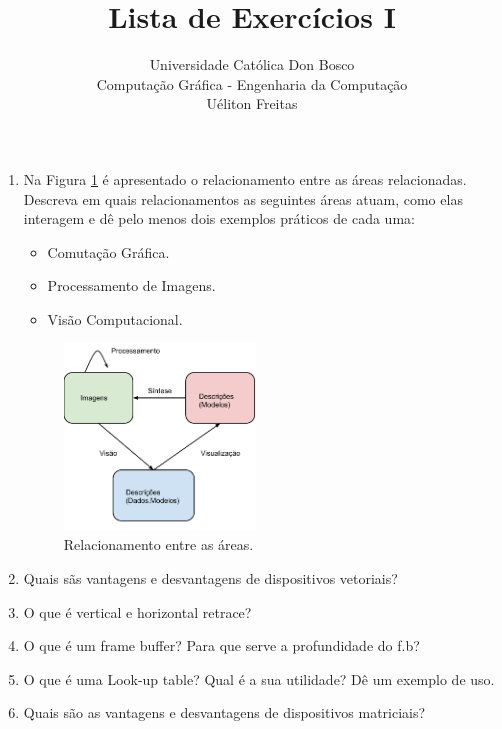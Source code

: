 \documentclass[12pt,a4paper]{article}
\author{Universidade Católica Don Bosco \\ Computação Gráfica - Engenharia da Computação \\Uéliton Freitas}
\title{Lista de Exercícios I}
\begin{document}
\maketitle


\begin{enumerate}
	\item Na Figura \ref{Fig:are} é apresentado o relacionamento entre as áreas relacionadas. Descreva em quais relacionamentos as seguintes áreas atuam, como elas interagem e dê pelo menos dois exemplos práticos de cada uma:
	\begin{itemize}
		\item Comutação Gráfica.
		\item Processamento de Imagens.
		\item Visão Computacional.
	\end{itemize}
	
		\begin{figure}[!h]
		\label{Fig:are}
			\begin{center}
			\includegraphics[width=0.48\textwidth]{Are}
			\caption{Relacionamento entre as áreas.}
			
			\end{center}
	\end{figure}
	

	\item Quais sãs vantagens e desvantagens de dispositivos vetoriais?	
	
	\item O que  é vertical e horizontal retrace?

	\item O que  é um frame buffer? Para que serve a profundidade do f.b?

	\item O que  é uma Look-up table? Qual  é a sua utilidade? Dê um exemplo de uso.

	\item Quais são as vantagens e desvantagens de dispositivos matriciais?


\end{enumerate}
\end{document}
